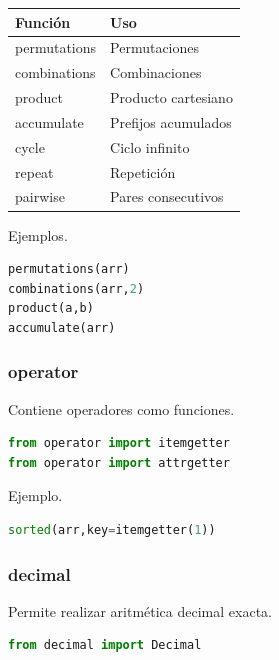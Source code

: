 \begin{center}
\begin{tabular}{|l|l|}
\hline
Función & Uso \\ \hline
permutations & Permutaciones \\ \hline
combinations & Combinaciones \\ \hline
product & Producto cartesiano \\ \hline
accumulate & Prefijos acumulados \\ \hline
cycle & Ciclo infinito \\ \hline
repeat & Repetición \\ \hline
pairwise & Pares consecutivos \\ \hline
\end{tabular}
\end{center}

\vspace{0.3cm}

Ejemplos.

\begin{lstlisting}[language=Python]
permutations(arr)
combinations(arr,2)
product(a,b)
accumulate(arr)
\end{lstlisting}

\vspace{0.3cm}

\subsubsection{operator}

Contiene operadores como funciones.

\begin{lstlisting}[language=Python]
from operator import itemgetter
from operator import attrgetter
\end{lstlisting}

Ejemplo.

\begin{lstlisting}[language=Python]
sorted(arr,key=itemgetter(1))
\end{lstlisting}

\vspace{0.3cm}

\subsubsection{decimal}

Permite realizar aritmética decimal exacta.

\begin{lstlisting}[language=Python]
from decimal import Decimal
\end{lstlisting}

